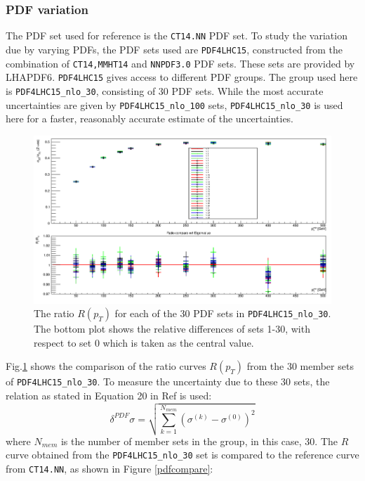 \documentclass[11pt,a4paper,final]{report}
\begin{document}
\subsubsection{PDF variation}
The PDF set used for reference is the \texttt{CT14.NN} PDF set. To study the variation due by varying PDFs, the PDF sets used are \texttt{PDF4LHC15}\cite{PDF4}, constructed from the combination of \texttt{CT14,MMHT14} and \texttt{NNPDF3.0} PDF sets. These sets are provided by LHAPDF6\cite{LHAPDF}. \texttt{PDF4LHC15} gives access to different PDF groups. The group used here is \texttt{PDF4LHC15\_nlo\_30}, consisting of 30 PDF sets. While the most accurate uncertainties are given by \texttt{PDF4LHC15\_nlo\_100} sets, \texttt{PDF4LHC15\_nlo\_30} is used here for a faster, reasonably accurate estimate of the uncertainties.
\begin{figure}[H]
\centering
	\includegraphics[width = 0.8\linewidth]{PDF4_30_overlay.png}
	\caption{The ratio $R(p_T)$ for each of the 30 PDF sets in \texttt{PDF4LHC15\_nlo\_30}. The bottom plot shows the relative differences of sets 1-30, with respect to set 0 which is taken as the central value.}
	\label{fig:PDF30var}
\end{figure}
\noindent Fig.\ref{fig:PDF30var} shows the comparison of the ratio curves $R(p_T)$ from the 30 member sets of \texttt{PDF4LHC15\_nlo\_30}. To measure the uncertainty due to these 30 sets, the relation as stated in Equation 20 in Ref \cite{PDF4} is used:
\begin{equation}\label{eq:PDFerr}
	\delta^{PDF}\sigma = \sqrt{\sum^{N_{mem}}_{k=1} (\sigma^{(k)} - \sigma^{(0)})^2}
\end{equation}
where $N_{mem}$ is the number of member sets in the group, in this case, 30. The $R$ curve obtained from the \texttt{PDF4LHC15\_nlo\_30} set is compared to the reference curve from \texttt{CT14.NN}, as shown in Figure \ref{pdfcompare}:
\end{document}
